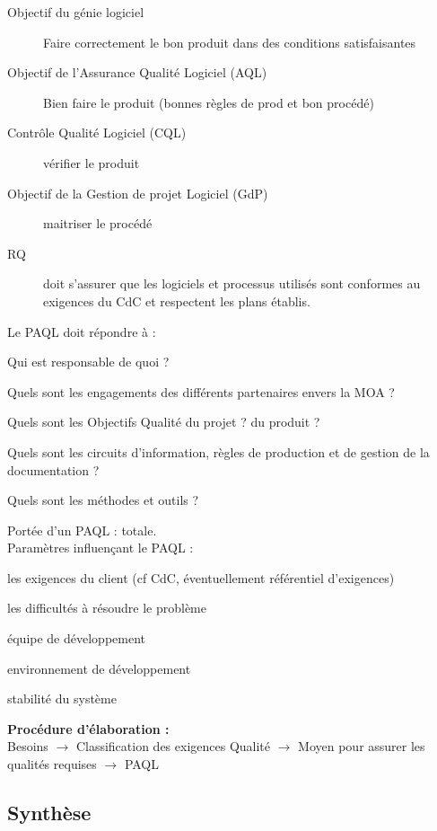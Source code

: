 	\begin{description}
		\item[Objectif du génie logiciel] Faire correctement le bon produit dans des conditions satisfaisantes
		\item[Objectif de l’Assurance Qualité Logiciel (AQL)] Bien faire le produit (bonnes règles de prod et bon procédé)
		\item[Contrôle Qualité Logiciel (CQL)] vérifier le produit
		\item[Objectif de la Gestion de projet Logiciel (GdP)] maitriser le procédé
		\item[RQ] doit s’assurer que les logiciels et processus utilisés sont conformes au exigences du CdC et respectent les plans établis.
	\end{description}

	Le PAQL doit répondre à :
	\begin{description}
		\item Qui est responsable de quoi ?
		\item Quels sont les engagements des différents partenaires envers la MOA ?
		\item Quels sont les Objectifs Qualité du projet ? du produit ?
		\item Quels sont les circuits d’information, règles de production et de gestion de la documentation ?
		\item Quels sont les méthodes et outils ?
	\end{description}

Portée d’un PAQL : totale.\\

Paramètres influençant le PAQL :
	\begin{description}
	\item les exigences du client (cf CdC, éventuellement référentiel d'exigences)
	\item les difficultés à résoudre le problème
	\item équipe de développement
	\item environnement de développement
	\item stabilité du système
	\end{description}

\textbf{Procédure d’élaboration :}\hfill\\
	Besoins $\rightarrow$ Classification des exigences Qualité $\rightarrow$ Moyen pour assurer les qualités requises $\rightarrow$ PAQL

	\subsection{Synthèse}
	
